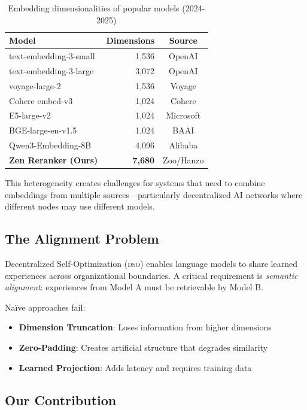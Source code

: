 \documentclass[11pt,letterpaper]{article}
\newcommand{\DSO}{\textsc{dso}}
\begin{document}
\begin{table}[h]
\centering
\caption{Embedding dimensionalities of popular models (2024-2025)}
\label{tab:dims}
\begin{tabular}{lrc}
\toprule
\textbf{Model} & \textbf{Dimensions} & \textbf{Source} \\
\midrule
text-embedding-3-small & 1,536 & OpenAI \\
text-embedding-3-large & 3,072 & OpenAI \\
voyage-large-2 & 1,536 & Voyage \\
Cohere embed-v3 & 1,024 & Cohere \\
E5-large-v2 & 1,024 & Microsoft \\
BGE-large-en-v1.5 & 1,024 & BAAI \\
Qwen3-Embedding-8B & 4,096 & Alibaba \\
\textbf{Zen Reranker (Ours)} & \textbf{7,680} & Zoo/Hanzo \\
\bottomrule
\end{tabular}
\end{table}

This heterogeneity creates challenges for systems that need to combine embeddings from multiple sources---particularly decentralized AI networks where different nodes may use different models.

\subsection{The Alignment Problem}

Decentralized Self-Optimization (\DSO{}) enables language models to share learned experiences across organizational boundaries. A critical requirement is \emph{semantic alignment}: experiences from Model A must be retrievable by Model B.

Na\"ive approaches fail:
\begin{itemize}
    \item \textbf{Dimension Truncation}: Loses information from higher dimensions
    \item \textbf{Zero-Padding}: Creates artificial structure that degrades similarity
    \item \textbf{Learned Projection}: Adds latency and requires training data
\end{itemize}

\subsection{Our Contribution}
\end{document}
